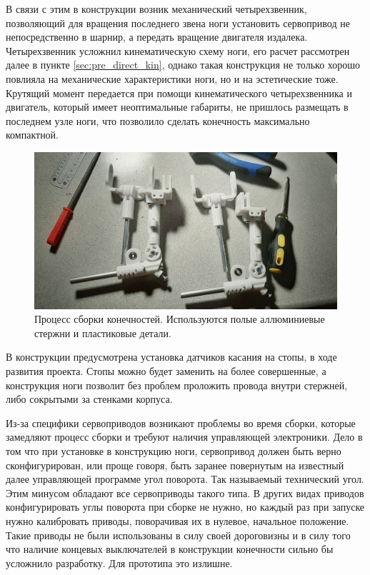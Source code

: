 В связи с этим в конструкции возник механический четырехзвенник, позволяющий для вращения последнего звена ноги установить сервопривод не непосредственно в шарнир, а передать вращение двигателя издалека. Четырехзвенник усложнил кинематическую схему ноги, его расчет рассмотрен далее в пункте \ref{sec:pre_direct_kin}, однако такая конструкция не только хорошо повлияла на механические характеристики ноги, но и на эстетические тоже. Крутящий момент передается при помощи кинематического четырехзвенника и двигатель, который имеет неоптимальные габариты, не пришлось размещать в последнем узле ноги, что позволило сделать конечность максимально компактной.

\begin{figure}[h]
    \centering
    \includegraphics[width=\textwidth]{chapter_mechanics_construction/figure12.png}
    \caption{Процесс сборки конечностей. Используются полые аллюминиевые стержни и пластиковые детали.}
    \label{}
\end{figure}

В конструкции предусмотрена установка датчиков касания на стопы, в ходе развития проекта. Стопы можно будет заменить на более совершенные, а конструкция ноги позволит без проблем проложить провода внутри стержней, либо сокрытыми за стенками корпуса.

Из-за специфики сервоприводов возникают проблемы во время сборки, которые замедляют процесс сборки и требуют наличия управляющей электроники. Дело в том что при установке в конструкцию ноги, сервопривод должен быть верно сконфигурирован, или проще говоря, быть заранее повернутым на известный далее управляющей программе угол поворота. Так называемый технический угол. Этим минусом обладают все сервоприводы такого типа. В других видах приводов конфигурировать углы поворота при сборке не нужно, но каждый раз при запуске нужно калибровать приводы, поворачивая их в нулевое, начальное положение. Такие приводы не были использованы в силу своей дороговизны и в силу того что наличие концевых выключателей в конструкции конечности сильно бы усложнило разработку. Для прототипа это излишне.

